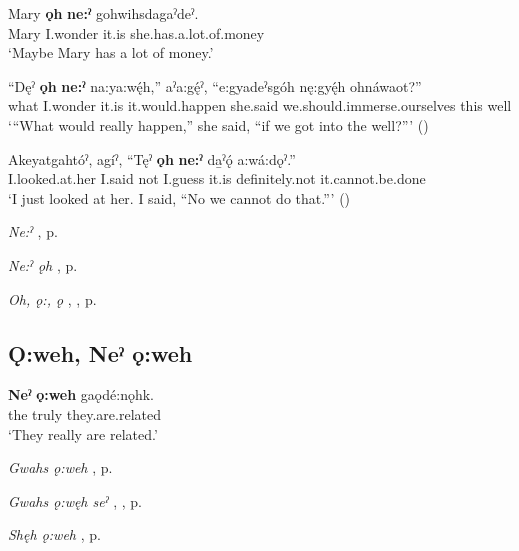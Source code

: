 \ea
\label{ex:onpart1}
\gll Mary \textbf{ǫh} \textbf{ne:ˀ} gohwihsdagaˀdeˀ.\\
Mary I.wonder it.is she.has.a.lot.of.money\\
\glt ‘Maybe Mary has a lot of money.’
\z


\ea
\label{ex:onpart2}
\gll “Dęˀ \textbf{ǫh} \textbf{ne:ˀ} na:ya:wę́h,” aˀa:gę́ˀ, “e:gyadeˀsgóh nę:gyę́h ohnáwaot?” \\
what I.wonder it.is it.would.happen she.said we.should.immerse.ourselves this well \\
\glt ‘“What would really happen,” she said, “if we got into the well?”’ (\cite{henry_de_2005})
\z

\ea
\label{ex:onpart3}
\gll Akeyatgahtóˀ, agíˀ, “Tęˀ \textbf{ǫh} \textbf{ne:ˀ} da̱ˀǫ́ a:wá:dǫˀ.” \\
I.looked.at.her I.said not I.guess it.is definitely.not it.cannot.be.done\\
\glt ‘I just looked at her. I said, “No we cannot do that.”’ (\cite{henry_de_2005})
\z

\begin{CayugaRelated}
\item \textit{Ne:ˀ} , p. \pageref{p:[ne:ˀ] `it is’}\\
\item \textit{Ne:ˀ ǫh} , p. \pageref{p:[ne:ˀ ǫh]}\\
\item \textit{Oh, ǫ:, ǫ} , , p. \pageref{p:[ǫh, ǫ:, ǫ]}
\end{CayugaRelated}


\subsection*{\textbf{Ǫ:weh, Neˀ ǫ:weh} } \label{p:[ǫ:weh, neˀ ǫ:weh]}

\ea
\label{ex:onpart12}
\gll \textbf{Neˀ} \textbf{ǫ:weh} gaǫdé:nǫhk. \\
the truly they.are.related\\
\glt ‘They really are related.’
\z

\begin{CayugaRelated}
\item \textit{Gwahs ǫ:weh} , p. \pageref{p:[gwahs ǫ:weh]}\\
\item \textit{Gwahs ǫ:węh seˀ} , , p. \pageref{p:[gwahs ǫ:węh seˀ]}\\
\item \textit{Shęh ǫ:weh} , p. \pageref{p:[shęh ǫ:weh] ‘it is really’}
\end{CayugaRelated}


